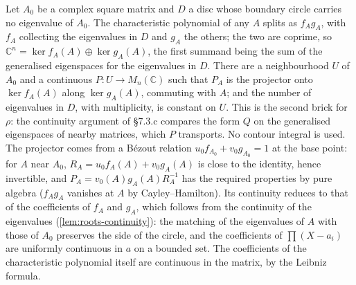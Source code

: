 \begin{lemma}
  \label{lem:spectral-projector}
  \leanok
  Let $A_0$ be a complex square matrix and $D$ a disc whose boundary circle
  carries no eigenvalue of $A_0$.  The characteristic polynomial of any $A$
  splits as $f_A g_A$, with $f_A$ collecting the eigenvalues in $D$ and $g_A$ the
  others; the two are coprime, so $\mathbb{C}^n = \ker f_A(A) \oplus \ker g_A(A)$,
  the first summand being the sum of the generalised eigenspaces for the
  eigenvalues in $D$.  There are a neighbourhood $U$ of $A_0$ and a continuous
  $P \colon U \to M_n(\mathbb{C})$ such that $P_A$ is the projector onto
  $\ker f_A(A)$ along $\ker g_A(A)$, commuting with $A$; and the number of
  eigenvalues in $D$, with multiplicity, is constant on $U$.  This is the
  second brick for $\rho$: the continuity argument of \S7.3.c compares the form
  $Q$ on the generalised eigenspaces of nearby matrices, which $P$ transports.
  No contour integral is used.  The projector comes from a B\'ezout relation
  $u_0 f_{A_0} + v_0 g_{A_0} = 1$ at the base point: for $A$ near $A_0$,
  $R_A = u_0 f_A(A) + v_0 g_A(A)$ is close to the identity, hence invertible,
  and $P_A = v_0(A) g_A(A) R_A^{-1}$ has the required properties by pure algebra
  ($f_A g_A$ vanishes at $A$ by Cayley--Hamilton).  Its continuity reduces to
  that of the coefficients of $f_A$ and $g_A$, which follows from the continuity
  of the eigenvalues (\ref{lem:roots-continuity}): the matching of the
  eigenvalues of $A$ with those of $A_0$ preserves the side of the circle, and
  the coefficients of $\prod (X - a_i)$ are uniformly continuous in $a$ on a
  bounded set.  The coefficients of the characteristic polynomial itself are
  continuous in the matrix, by the Leibniz formula.
\end{lemma}

